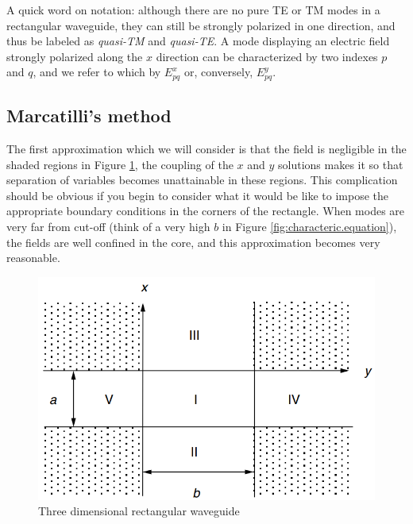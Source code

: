 A quick word on notation: although there are no pure TE or TM modes in a rectangular waveguide, they can still be strongly polarized in one direction, and thus be labeled as \textit{quasi-TM} and \textit{quasi-TE}. A mode displaying an electric field strongly polarized along the $x$ direction can be characterized by two indexes $p$ and $q$, and we refer to which by $E^x_{pq}$ or, conversely, $E^y_{pq}$.

\subsection{Marcatilli's method}

The first approximation which we will consider is that the field is negligible in the shaded regions in Figure \ref{fig:rec.waveguide}, the coupling of the $x$ and $y$ solutions makes it so that separation of variables becomes unattainable in these regions. This complication should be obvious if you begin to consider what it would be like to impose the appropriate boundary conditions in the corners of the rectangle. When modes are very far from cut-off (think of a very high $b$ in Figure \ref{fig:characteric.equation}), the fields are well confined in the core, and this approximation becomes very reasonable.

\begin{figure}[h]
    \centering
    \includegraphics[width=0.6\linewidth]{Figuras/three dimensional rectangular waveguide.png}
    \caption{Three dimensional rectangular waveguide}
    \label{fig:rec.waveguide}
\end{figure}

